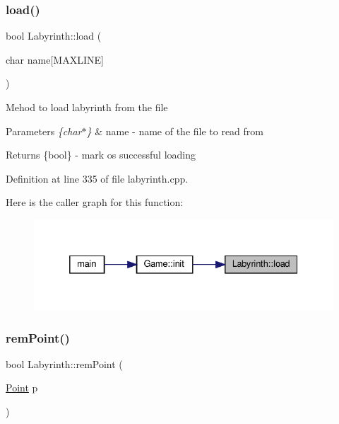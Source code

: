 \subsubsection{\texorpdfstring{load()}{load()}}
{\footnotesize\ttfamily bool Labyrinth\+::load (\begin{DoxyParamCaption}\item[{char}]{name\mbox{[}\+M\+A\+X\+L\+I\+N\+E\mbox{]} }\end{DoxyParamCaption})}

Mehod to load labyrinth from the file 
\begin{DoxyParams}{Parameters}
{\em \{char$\ast$\}} & name -\/ name of the file to read from \\
\hline
\end{DoxyParams}
\begin{DoxyReturn}{Returns}
\{bool\} -\/ mark os successful loading 
\end{DoxyReturn}


Definition at line 335 of file labyrinth.\+cpp.

Here is the caller graph for this function\+:
\nopagebreak
\begin{figure}[H]
\begin{center}
\leavevmode
\includegraphics[width=332pt]{class_labyrinth_a36cd7033292515cba0ce3d74f03720b6_icgraph}
\end{center}
\end{figure}
\mbox{\label{class_labyrinth_a24d98083c011da23695425ec69d583a5}} 
\subsubsection{\texorpdfstring{remPoint()}{remPoint()}}
{\footnotesize\ttfamily bool Labyrinth\+::rem\+Point (\begin{DoxyParamCaption}\item[{\mbox{\hyperlink{common_8h_aa9cfdb80b4ca12013a2de8a3b9b97981}{Point}}}]{p }\end{DoxyParamCaption})}

